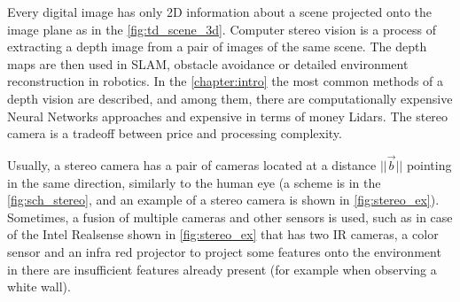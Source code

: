 Every digital image has only 2D information about a scene projected onto the image plane as in the \autoref{fig:td_scene_3d}.
Computer stereo vision is a process of extracting a depth image from a pair of images of the same scene. 
The depth maps are then used in SLAM, obstacle avoidance or detailed environment reconstruction in robotics.
In the \autoref{chapter:intro} the most common methods of a depth vision are described, and among them, there are computationally expensive Neural Networks approaches and expensive in terms of money Lidars.
The stereo camera is a tradeoff between price and processing complexity.

Usually, a stereo camera has a pair of cameras located at a distance $||\vec{b}||$ pointing in the same direction, similarly to the human eye (a scheme is in the \autoref{fig:sch_stereo}, and an example of a stereo camera is shown in \autoref{fig:stereo_ex}). 
Sometimes, a fusion of multiple cameras and other sensors is used, such as in case of the Intel Realsense shown in \autoref{fig:stereo_ex} that has two IR cameras, a color sensor and an infra red projector to project some features onto the environment in there are insufficient features already present (for example when observing a white wall).




